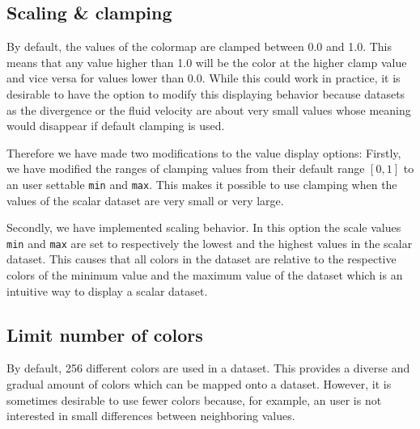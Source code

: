 	\subsection{Scaling \& clamping}
		By default, the values of the colormap are clamped between 0.0 and 1.0. 
		This means that any value higher than 1.0 will be the color at the higher clamp value and vice versa for values lower than 0.0.
		While this could work in practice, it is desirable to have the option to modify this displaying behavior because datasets as the divergence or the fluid velocity are about very small values whose meaning would disappear if default clamping is used.

		Therefore we have made two modifications to the value display options:
		Firstly, we have modified the ranges of clamping values from their default range \([0, 1]\) to an user settable \texttt{min} and \texttt{max}. 
		This makes it possible to use clamping when the values of the scalar dataset are very small or very large.

		Secondly, we have implemented scaling behavior. 
		In this option the scale values \texttt{min} and \texttt{max} are set to respectively the lowest and the highest values in the scalar dataset. 
		This causes that all colors in the dataset are relative to the respective colors of the minimum value and the maximum value of the dataset which is an intuitive way to display a scalar dataset.
	\subsection{Limit number of colors}
		By default, 256 different colors are used in a dataset. 
		This provides a diverse and gradual amount of colors which can be mapped onto a dataset.
		However, it is sometimes desirable to use fewer colors because, for example, an user is not interested in small differences between neighboring values.

